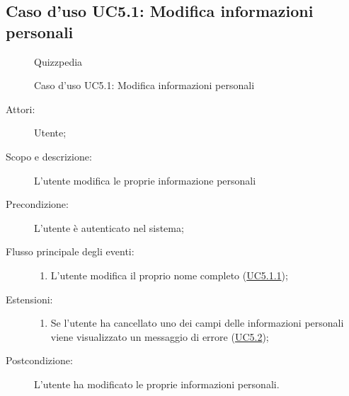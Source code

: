 \subsection{Caso d'uso UC5.1: Modifica informazioni personali}
        \begin{figure}[H]
            \centering
            \begin{resizedtikzpicture}{\textwidth}
		\begin{umlsystem}[x=0, fill=lightgray!20]{Quizzpedia}
		\end{umlsystem}
            \end{resizedtikzpicture}
            \caption{Caso d'uso UC5.1: Modifica informazioni personali}
            \label{fig:UC5.1} 
        \end{figure}
    \begin{description}
\item[Attori:] Utente;
\item[Scopo e descrizione:] L'utente modifica le proprie informazione personali
      \item[Precondizione:] L'utente è autenticato nel sistema;

        \item[Flusso principale degli eventi:] \begin{enumerate}
          \item L’utente modifica il proprio nome completo (\hyperlink{UC5.1.1}{UC5.1.1});

      \end{enumerate}
    \item[Estensioni:]
      \begin{enumerate}
          \item Se l'utente ha cancellato uno dei campi delle informazioni personali viene visualizzato un messaggio di errore (\hyperlink{UC5.2}{UC5.2});

      \end{enumerate}
    \item[Postcondizione:] L'utente ha modificato le proprie informazioni personali.
  \end{description}
\hypertarget{UC5.1.1}{}
